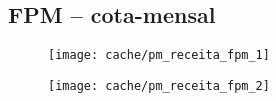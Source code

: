 
\subsection{FPM – cota-mensal}





\begin{figure}[H]
\center
\texttt{[image: cache/pm\_receita\_fpm\_1]}
\end{figure}

\begin{figure}[H]
\center
\texttt{[image: cache/pm\_receita\_fpm\_2]}
\end{figure}

